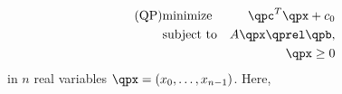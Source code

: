 \begin{eqnarray*}
\mbox{(QP)}& \mbox{minimize} 
&\qpc^{T}\qpx+c_0 \\
&\mbox{subject to}   & A\qpx\qprel \qpb, \\
&                    & \qpx \geq 0
\end{eqnarray*}
in $n$ real variables $\qpx=(x_0,\ldots,x_{n-1})$.
Here, 
\begin{itemize}


\end{itemize}
